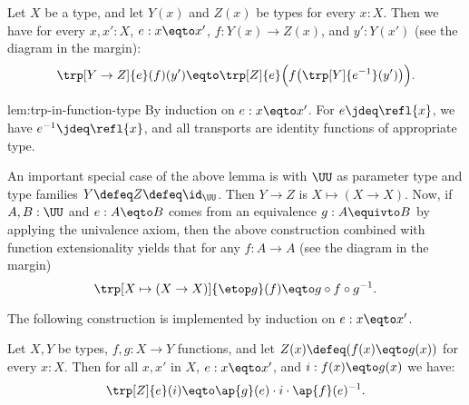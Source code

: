 \begin{construction}\label{lem:trp-in-function-type}
Let $X$ be a type, and let $Y(x)$ and $Z(x)$ be types for every $x:X$.
Then we have for every $x,x':X$, $e: x \eqto x'$, $f: Y(x)\to Z(x)$, and $y':Y(x')$ (see the diagram in the margin):%
\[
\trp[Y\to Z]{e}(f)(y') \eqto \trp[Z]{e} \Bigl(f\bigl(\trp[Y]{e^{-1}}(y')\bigr)\Bigr).
\]
\end{construction}
\begin{implementation}{lem:trp-in-function-type}
By induction on $e: x \eqto x'$. For $e \jdeq \refl{x}$, we have $e^{-1}\jdeq \refl{x}$,
and all transports are identity functions of appropriate type.
\end{implementation}

An important special case of the above lemma is with $\UU$
as parameter type and type families $Y\defeq Z\defeq \id_\UU$.
Then $Y\to Z$ is $X \mapsto (X\to X)$. Now,
if $A,B:\UU$ and $e: A \eqto B$ comes from an equivalence $g:A\equivto B$
by applying the univalence axiom, 
then the above construction combined with function extensionality
yields that for any $f: A\to A$ (see the diagram in the margin)
\[
\trp[X \mapsto (X\to X)]{\etop g} (f) \eqto g\circ f \circ g^{-1}.
\]

The following construction is implemented by induction on $e: x \eqto x'$.

\begin{construction}\label{lem:trp-in-fx=Ygx}
Let $X,Y$ be types, $f,g: X\to Y$ functions, and let
$Z(x)\defeq (f(x) \eqto g(x))$ for every $x:X$.
Then for all $x,x'$ in $X$, $e: x \eqto x'$, and $i: f(x) \eqto g(x)$ we have:
\[
\trp[Z]{ e} (i) \eqto \ap{g}(e) \cdot i \cdot \ap{f}(e)^{-1}.
\]
\end{construction}

